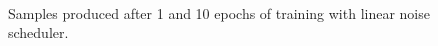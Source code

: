 \documentclass[fullpaper]{nldl}
\begin{document}
\begin{figure}[h!]
	\centering
	\\
	\caption{Samples produced after 1 and 10 epochs of training with linear noise scheduler. \label{fig:linear}}
\end{figure}
\end{document}
